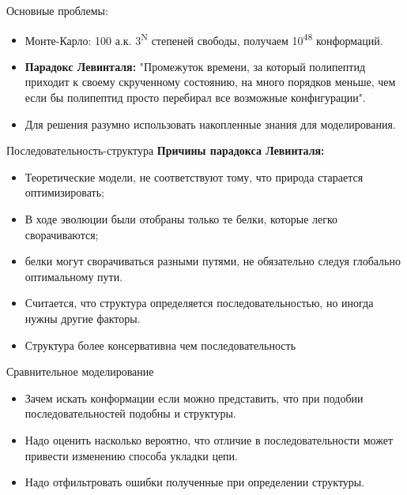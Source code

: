 \begin{frame}
{Основные проблемы:}{}
 \begin{itemize}
  \item
	  Монте-Карло: 100 а.к. 3\textsuperscript{N} степеней свободы, получаем 10\textsuperscript{48} конформаций.
\vspace{0.2cm}
  \item
	  \textbf{Парадокс Левинталя:} "Промежуток времени, за который полипептид приходит к своему скрученному состоянию, на много порядков меньше, чем если бы полипептид просто перебирал все возможные конфигурации".
\vspace{0.2cm}
  \item
Для решения разумно использовать накопленные знания для моделирования.
 \end{itemize}
\end{frame}
\begin{frame}
{Последовательность-структура}{}
	\textbf{Причины парадокса Левинталя:}
 \begin{itemize}
\item
Теоретические модели, не соответствуют тому, что природа старается оптимизировать;	  
\vspace{0.2cm}
\item
В ходе эволюции были отобраны только те белки, которые легко сворачиваются;	  
\vspace{0.2cm}
\item
белки могут сворачиваться разными путями, не обязательно следуя глобально оптимальному пути.
	\vspace{.5cm}
\item
Считается, что структура определяется последовательностью, но иногда нужны другие факторы.
\item
Структура более консервативна чем последовательность
 \end{itemize}
\end{frame}
\begin{frame}
{Сравнительное моделирование}{}
 \begin{itemize}
  \item
	  Зачем искать конформации если можно представить, что при подобии последовательностей подобны и структуры.
\vspace{0.2cm}
  \item
	  Надо оценить насколько вероятно, что отличие в последовательности может привести изменению способа укладки цепи.
\vspace{0.2cm}
  \item
	  Надо отфильтровать ошибки полученные при определении структуры.
  \end{itemize}
\end{frame}
